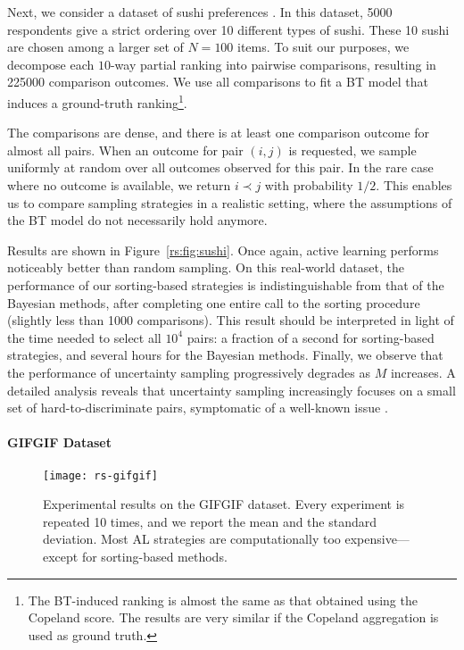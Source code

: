 Next, we consider a dataset of sushi preferences \citep{kamishima2009efficient}.
In this dataset, \num{5000} respondents give a strict ordering over \num{10} different types of sushi.
These \num{10} sushi are chosen among a larger set of $N = \num{100}$ items.
To suit our purposes, we decompose each $10$-way partial ranking into pairwise comparisons, resulting in \num{225000} comparison outcomes.
We use all comparisons to fit a BT model that induces a ground-truth ranking\footnote{%
The BT-induced ranking is almost the same as that obtained using the Copeland score.
The results are very similar if the Copeland aggregation is used as ground truth.}.

The comparisons are dense, and there is at least one comparison outcome for almost all pairs.
When an outcome for pair $(i,j)$ is requested, we sample uniformly at random over all outcomes observed for this pair.
In the rare case where no outcome is available, we return $i \prec j$ with probability $1/2$.
This enables us to compare sampling strategies in a realistic setting, where the assumptions of the BT model do not necessarily hold anymore.

Results are shown in Figure~\ref{rs:fig:sushi}.
Once again, active learning performs noticeably better than random sampling.
On this real-world dataset, the performance of our sorting-based strategies is indistinguishable from that of the Bayesian methods, after completing one entire call to the sorting procedure (slightly less than \num{1000} comparisons).
This result should be interpreted in light of the time needed to select all $10^4$ pairs: a fraction of a second for sorting-based strategies, and several hours for the Bayesian methods.
Finally, we observe that the performance of uncertainty sampling progressively degrades as $M$ increases.
A detailed analysis reveals that uncertainty sampling increasingly focuses on a small set of hard-to-discriminate pairs, symptomatic of a well-known issue \citep{settles2012active}.


\paragraph{GIFGIF Dataset}

\begin{figure}
\centering
\texttt{[image: rs-gifgif]}
\caption{
Experimental results on the GIFGIF dataset.
Every experiment is repeated \num{10} times, and we report the mean and the standard deviation.
Most AL strategies are computationally too expensive---except for sorting-based methods.
}
\label{rs:fig:gifgif}
\end{figure}

